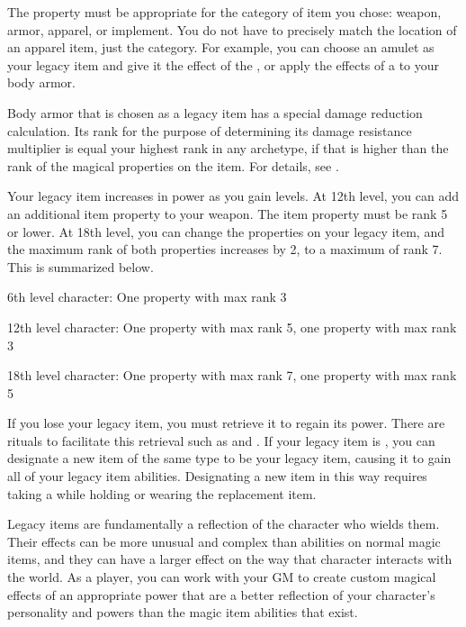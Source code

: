         The property must be appropriate for the category of item you chose: weapon, armor, apparel, or implement.
        You do not have to precisely match the location of an apparel item, just the category.
        For example, you can choose an amulet as your legacy item and give it the effect of the , or apply the effects of a  to your body armor.

         Body armor that is chosen as a legacy item has a special damage reduction calculation.
        Its rank for the purpose of determining its damage resistance multiplier is equal your highest rank in any archetype, if that is higher than the rank of the magical properties on the item.
        For details, see .

        Your legacy item increases in power as you gain levels.
        At 12th level, you can add an additional item property to your weapon.
        The item property must be rank 5 or lower.
        At 18th level, you can change the properties on your legacy item, and the maximum rank of both properties increases by 2, to a maximum of rank 7.
        This is summarized below.
        \begin{raggeditemize}
            \item 6th level character: One property with max rank 3
            \item 12th level character: One property with max rank 5, one property with max rank 3
            \item 18th level character: One property with max rank 7, one property with max rank 5
        \end{raggeditemize}

        If you lose your legacy item, you must retrieve it to regain its power.
        There are rituals to facilitate this retrieval such as  and .
        If your legacy item is , you can designate a new item of the same type to be your legacy item, causing it to gain all of your legacy item abilities.
        Designating a new item in this way requires taking a  while holding or wearing the replacement item.

            Legacy items are fundamentally a reflection of the character who wields them.
            Their effects can be more unusual and complex than abilities on normal magic items, and they can have a larger effect on the way that character interacts with the world.
            As a player, you can work with your GM to create custom magical effects of an appropriate power that are a better reflection of your character's personality and powers than the magic item abilities that exist.
